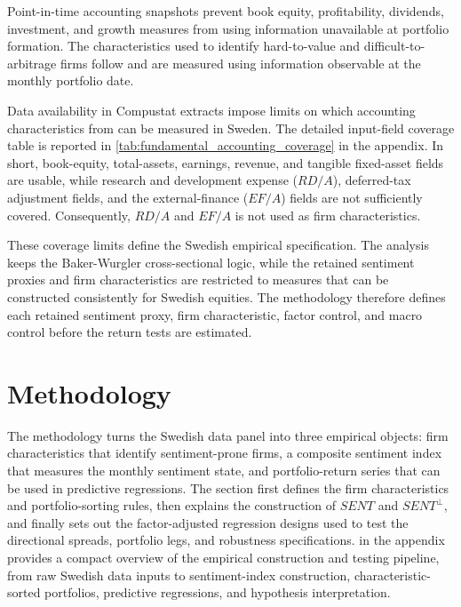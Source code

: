 \documentclass[11pt]{article}
\newcommand{\var}[1]{\ensuremath{#1}}
\begin{document}
Point-in-time accounting snapshots prevent book equity, profitability, dividends, investment, and growth measures from using information unavailable at portfolio formation. The characteristics used to identify hard-to-value and difficult-to-arbitrage firms follow \citet{baker2006sentiment} and are measured using information observable at the monthly portfolio date.

Data availability in Compustat extracts impose limits on which accounting characteristics from \citet{baker2006sentiment} can be measured in Sweden. The detailed input-field coverage table is reported in \cref{tab:fundamental_accounting_coverage} in the appendix. In short, book-equity, total-assets, earnings, revenue, and tangible fixed-asset fields are usable, while research and development expense (\var{RD/A}), deferred-tax adjustment fields, and the external-finance (\var{EF/A}) fields are not sufficiently covered. Consequently, \var{RD/A} and \var{EF/A} is not used as firm characteristics.

These coverage limits define the Swedish empirical specification. The analysis keeps the Baker-Wurgler cross-sectional logic, while the retained sentiment proxies and firm characteristics are restricted to measures that can be constructed consistently for Swedish equities. The methodology therefore defines each retained sentiment proxy, firm characteristic, factor control, and macro control before the return tests are estimated.

\section{Methodology}
The methodology turns the Swedish data panel into three empirical objects: firm characteristics that identify sentiment-prone firms, a composite sentiment index that measures the monthly sentiment state, and portfolio-return series that can be used in predictive regressions. The section first defines the firm characteristics and portfolio-sorting rules, then explains the construction of \var{SENT} and \var{SENT^{\perp}}, and finally sets out the factor-adjusted regression designs used to test the directional spreads, portfolio legs, and robustness specifications.  in the appendix provides a compact overview of the empirical construction and testing pipeline, from raw Swedish data inputs to sentiment-index construction, characteristic-sorted portfolios, predictive regressions, and hypothesis interpretation.
\end{document}
